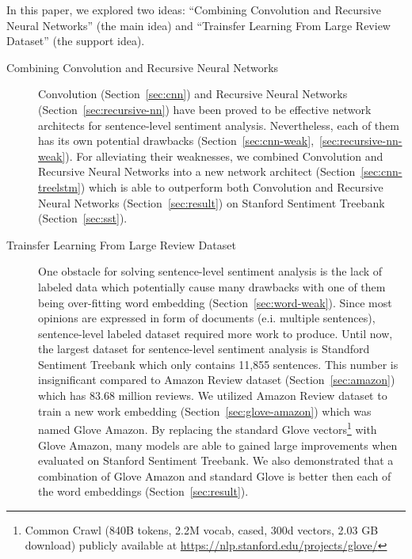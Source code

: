 In this paper, we explored two ideas: ``Combining Convolution and Recursive Neural Networks'' (the main idea) and ``Trainsfer Learning From Large Review Dataset'' (the support idea).
\begin{description}
	\item[Combining Convolution and Recursive Neural Networks] Convolution (Section~\ref{sec:cnn}) and Recursive Neural Networks (Section~\ref{sec:recursive-nn}) have been proved to be effective network architects for sentence-level sentiment analysis.
	Nevertheless, each of them has its own potential drawbacks (Section~\ref{sec:cnn-weak},~\ref{sec:recursive-nn-weak}).
	For alleviating their weaknesses, we combined Convolution and Recursive Neural Networks into a new network architect (Section~\ref{sec:cnn-treelstm}) which is able to outperform both Convolution and Recursive Neural Networks (Section~\ref{sec:result}) on Stanford Sentiment Treebank (Section~\ref{sec:sst}).
	\item[Trainsfer Learning From Large Review Dataset] One obstacle for solving sentence-level sentiment analysis is the lack of labeled data which potentially cause many drawbacks with one of them being over-fitting word embedding (Section~\ref{sec:word-weak}).
	Since most opinions are expressed in form of  documents (e.i. multiple sentences), sentence-level labeled dataset required more work to produce.
	Until now, the largest dataset for sentence-level sentiment analysis is Standford Sentiment Treebank which only contains 11,855 sentences.
	This number is insignificant compared to Amazon Review dataset (Section~\ref{sec:amazon}) which has 83.68 million reviews.
	We utilized Amazon Review dataset to train a new work embedding (Section~\ref{sec:glove-amazon}) which was named Glove Amazon.
	By replacing the standard Glove vectors\footnote{Common Crawl (840B tokens, 2.2M vocab, cased, 300d vectors, 2.03 GB download) publicly available at \url{https://nlp.stanford.edu/projects/glove/}} with Glove Amazon, many models are able to gained large improvements when evaluated on Stanford Sentiment Treebank.
	We also demonstrated that a combination of Glove Amazon and standard Glove is better then each of the word embeddings (Section~\ref{sec:result}).
\end{description}

